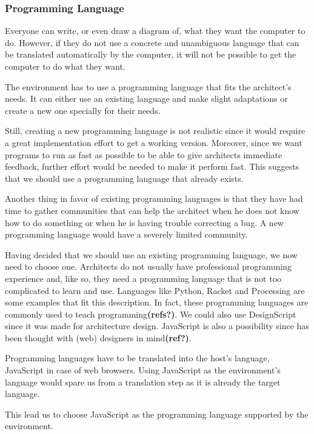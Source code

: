 \subsubsection{Programming Language}
Everyone can write, or even draw a diagram of, what they want the computer to do.
However, if they do not use a concrete and unambiguous language that can be translated automatically by the computer, it will not be possible to get the computer to do what they want.

The environment has to use a programming language that fits the architect's needs.
It can either use an existing language and make slight adaptations or create a new one specially for their needs.

Still, creating a new programming language is not realistic since it would require a great implementation effort to get a working version.
Moreover, since we want programs to run as fast as possible to be able to give architects immediate feedback, further effort would be needed to make it perform fast.
This suggests that we should use a programming language that already exists.

Another thing in favor of existing programming languages is that they have had time to gather communities that can help the architect when he does not know how to do something or when he is having trouble correcting a bug.
A new programming language would have a severely limited community.

Having decided that we should use an existing programming language, we now need to choose one.
Architects do not usually have professional programming experience and, like so, they need a programming language that is not too complicated to learn and use.
Languages like Python, Racket and Processing are some examples that fit this description.
In fact, these programming languages are commonly used to teach programming{\bf(refs?)}.
We could also use DesignScript since it was made for architecture design\cite{aish2012designscript}.
JavaScript is also a possibility since has been thought with (web) designers in mind{\bf(ref?)}.

Programming languages have to be translated into the host's language, JavaScript in case of web browsers.
Using JavaScript as the environment's language would spare us from a translation step as it is already the target language.

This lead us to choose JavaScript as the programming language supported by the environment.

